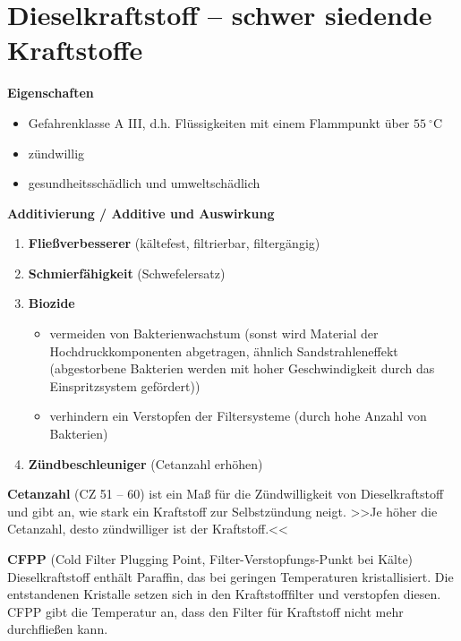 \section{Dieselkraftstoff -- schwer siedende
Kraftstoffe}\label{dieselkraftstoff-schwer-siedende-kraftstoffe}

\textbf{Eigenschaften}

\begin{itemize}
\item
  Gefahrenklasse A III, d.h. Flüssigkeiten mit einem Flammpunkt über
  $55~^\circ\text{C}$
\item
  zündwillig
\item
  gesundheitsschädlich und umweltschädlich
\end{itemize}

\textbf{Additivierung / Additive und Auswirkung}

\begin{enumerate}
\item
  \textbf{Fließverbesserer} (kältefest, filtrierbar, filtergängig)
\item
  \textbf{Schmierfähigkeit} (Schwefelersatz)
\item
  \textbf{Biozide}

  \begin{itemize}
  \item
    vermeiden von Bakterienwachstum (sonst wird Material der
    Hochdruckkomponenten abgetragen, ähnlich Sandstrahleneffekt
    (abgestorbene Bakterien werden mit hoher Geschwindigkeit durch das
    Einspritzsystem gefördert))
  \item
    verhindern ein Verstopfen der Filtersysteme (durch hohe Anzahl von
    Bakterien)
  \end{itemize}
\item
  \textbf{Zündbeschleuniger} (Cetanzahl erhöhen)
\end{enumerate}

\textbf{Cetanzahl} (CZ 51 -- 60) ist ein Maß für die Zündwilligkeit von
Dieselkraftstoff und gibt an, wie stark ein Kraftstoff zur Selbstzündung
neigt. >>Je höher die Cetanzahl, desto zündwilliger ist der
Kraftstoff.<<

\textbf{CFPP} (Cold Filter Plugging Point, Filter-Verstopfungs-Punkt bei
Kälte) Dieselkraftstoff enthält Paraffin, das bei geringen Temperaturen
kristallisiert. Die entstandenen Kristalle setzen sich in den
Kraftstofffilter und verstopfen diesen. CFPP gibt die Temperatur an,
dass den Filter für Kraftstoff nicht mehr durchfließen kann.

